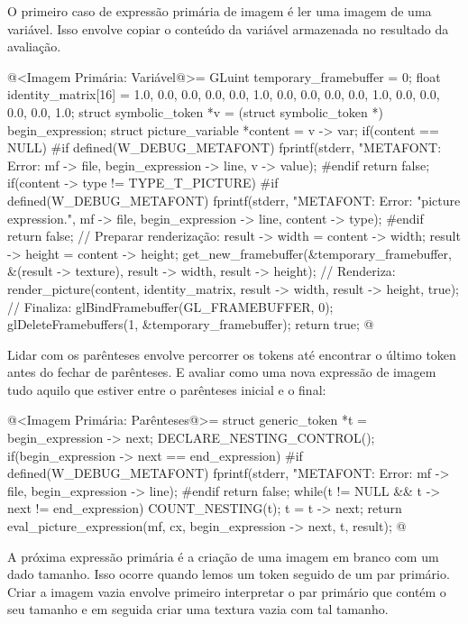 {O primeiro caso de expressão primária de imagem é ler uma imagem de
uma variável. Isso envolve copiar o conteúdo da variável armazenada no
resultado da avaliação.

\iniciocodigo
@<Imagem Primária: Variável@>=
GLuint temporary_framebuffer = 0;
float identity_matrix[16] = {1.0, 0.0, 0.0, 0.0,
                             0.0, 1.0, 0.0, 0.0,
                             0.0, 0.0, 1.0, 0.0,
                             0.0, 0.0, 0.0, 1.0};
struct symbolic_token *v = (struct symbolic_token *) begin_expression;
struct picture_variable *content = v -> var;
if(content == NULL){
#if defined(W_DEBUG_METAFONT)
  fprintf(stderr, "METAFONT: Error: %
          mf -> file, begin_expression -> line, v -> value);
#endif
  return false;
}
if(content -> type != TYPE_T_PICTURE){
#if defined(W_DEBUG_METAFONT)
  fprintf(stderr, "METAFONT: Error: %
                  "picture expression.\n",
          mf -> file, begin_expression -> line, content -> type);
#endif
  return false;
}
// Preparar renderização:
result -> width = content -> width;
result -> height = content -> height;
get_new_framebuffer(&temporary_framebuffer, &(result -> texture),
                    result -> width, result -> height);
// Renderiza:
render_picture(content, identity_matrix, result -> width, result -> height, true);
// Finaliza:
glBindFramebuffer(GL_FRAMEBUFFER, 0);
glDeleteFramebuffers(1, &temporary_framebuffer);
return true;
@
\fimcodigo

Lidar com os parênteses envolve percorrer os tokens até encontrar o
último token antes do fechar de parênteses. E avaliar como uma nova
expressão de imagem tudo aquilo que estiver entre o parênteses inicial
e o final:

\iniciocodigo
@<Imagem Primária: Parênteses@>=
struct generic_token *t = begin_expression -> next;
DECLARE_NESTING_CONTROL();
if(begin_expression -> next == end_expression){
#if defined(W_DEBUG_METAFONT)
  fprintf(stderr, "METAFONT: Error: %
          mf -> file, begin_expression -> line);
#endif
  return false;
}
while(t != NULL && t -> next != end_expression){
  COUNT_NESTING(t);
  t = t -> next;
}
return eval_picture_expression(mf, cx, begin_expression -> next, t, result);
@
\fimcodigo

A próxima expressão primária é a criação de uma imagem em branco com
um dado tamanho. Isso ocorre quando lemos um
token  seguido de um par primário. Criar a
imagem vazia envolve primeiro interpretar o par primário que contém o
seu tamanho e em seguida criar uma textura vazia com tal tamanho.

}
